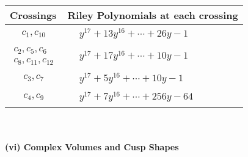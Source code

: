 \documentclass[1p]{elsarticle_modified}
\theoremstyle{definition}
\begin{document}
\begin{tabular}{m{50pt}|m{274pt}}
Crossings & \hspace{64pt}Riley Polynomials at each crossing \\
\hline $$\begin{aligned}c_{1},c_{10}\end{aligned}$$&$\begin{aligned}
&y^{17}+13 y^{16}+\cdots+26 y-1
\end{aligned}$\\
\hline $$\begin{aligned}c_{2},c_{5},c_{6}\\c_{8},c_{11},c_{12}\end{aligned}$$&$\begin{aligned}
&y^{17}+17 y^{16}+\cdots+10 y-1
\end{aligned}$\\
\hline $$\begin{aligned}c_{3},c_{7}\end{aligned}$$&$\begin{aligned}
&y^{17}+5 y^{16}+\cdots+10 y-1
\end{aligned}$\\
\hline $$\begin{aligned}c_{4},c_{9}\end{aligned}$$&$\begin{aligned}
&y^{17}+7 y^{16}+\cdots+256 y-64
\end{aligned}$\\
\hline
\end{tabular}\\~\\
\newpage\flushleft \textbf{(vi) Complex Volumes and Cusp Shapes}
\end{document}
